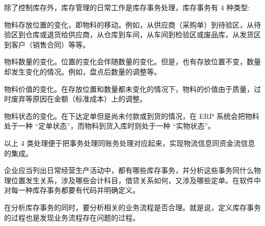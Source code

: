     除了控制库存外，库存管理的日常工作是库存事务处理，库存事务有 4 种类型:

        \begin{enumerate.zh}
            \item 物料存放位置的变化，即物料的移动。例如，从供应商（采购单）到待验区，从待验区到仓库或退货给供应商，从仓库到车间，从车间到检验区或废品库，从发货区到客户（销售合同）等等。

            \item 物料数量的变化。位置的变化会伴随数量的变化。但是，也有存放位置不变，数量却发生变化的情况。例如，盘点后数量的调整等。

            \item 物料价值的变化。在存放位置和数量都未变化的情况下，物料的价值由于质量，过时废弃等原因在金额（标准成本）上的调整。

            \item 物料状态的变化。在下达定单但是尚未付款或到货的情况，在 ERP 系统会把物料处于一种 “定单状态”，而物料到货入库时则处于一种 “实物状态”。
        \end{enumerate.zh}

    以上 4 类处理便于把事务处理同账务处理对应起来，实现物流信息同资金流信息的集成。

    企业应当列出日常经营生产活动中，都有哪些库存事务，并分析这些事务同什么物理位置发生关系，涉及哪些会计科目，借贷关系如何，又涉及哪些定单。在软件中对每一种库存事务都要有代码并明确定义。

    在分析库存事务的同时，要分析相关的业务流程是否合理。就是说，定义库存事务的过程也是发现业务流程存在问题的过程。
